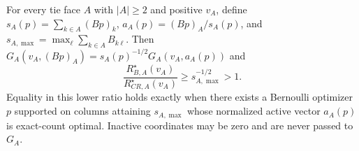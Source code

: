 For every tie face \(A\) with \(|A|\geq2\) and positive \(v_A\), define \(s_A(p)=\sum_{k\in A}(Bp)_k\), \(a_A(p)=(Bp)_A/s_A(p)\), and \(s_{A,\max}=\max_\ell\sum_{k\in A}B_{k\ell}\). Then \(G_A(v_A,(Bp)_A)=s_A(p)^{-1/2}G_A(v_A,a_A(p))\) and \[\frac{R_{B,A}^\star(v_A)}{R_{CR,A}^\star(v_A)}\geq s_{A,\max}^{-1/2}>1.\] Equality in this lower ratio holds exactly when there exists a Bernoulli optimizer \(p\) supported on columns attaining \(s_{A,\max}\) whose normalized active vector \(a_A(p)\) is exact-count optimal. Inactive coordinates may be zero and are never passed to \(G_A\).